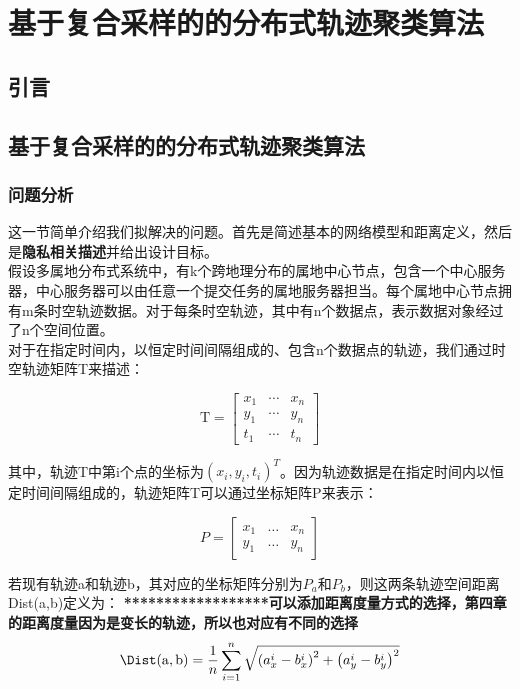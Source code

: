 \chapter{基于复合采样的的分布式轨迹聚类算法}
\section{引言}



\section{基于复合采样的的分布式轨迹聚类算法}

\subsection{问题分析}
这一节简单介绍我们拟解决的问题。首先是简述基本的网络模型和距离定义，然后是\textbf{隐私相关描述}并给出设计目标。\\
假设多属地分布式系统中，有k个跨地理分布的属地中心节点，包含一个中心服务器，中心服务器可以由任意一个提交任务的属地服务器担当。每个属地中心节点拥有m条时空轨迹数据。对于每条时空轨迹，其中有n个数据点，表示数据对象经过了n个空间位置。\\
对于在指定时间内，以恒定时间间隔组成的、包含n个数据点的轨迹，我们通过时空轨迹矩阵T来描述：

\[
\mathrm{T}=\left[\begin{array}{lll}
{x_{1}} & {\cdots} & {x_{n}} \\
{y_{1}} & {\cdots} & {y_{n}} \\
{t_{1}} & {\cdots} & {t_{n}}
\end{array}\right]
\]

其中，轨迹T中第i个点的坐标为$(x_i,y_i,t_i)^T$。因为轨迹数据是在指定时间内以恒定时间间隔组成的，轨迹矩阵T可以通过坐标矩阵P来表示：

\[
P=\left[\begin{array}{lll}
{x_{1}} & {\dots} & {x_{n}} \\
{y_{1}} & {\dots} & {y_{n}}
\end{array}\right]
\]

若现有轨迹a和轨迹b，其对应的坐标矩阵分别为$P_a$和$P_b$，则这两条轨迹空间距离Dist(a,b)定义为：
\textbf{******************可以添加距离度量方式的选择，第四章的距离度量因为是变长的轨迹，所以也对应有不同的选择}\\

\begin{equation}
\label{ch3dist}
\Dist(\mathrm{a}, \mathrm{b})=\frac{1}{n} \sum_{i=1}^{n} \sqrt{\left(a_{x}^{i}-b_{x}^{i}\right)^{2}+\left(a_{y}^{i}-b_{y}^{i}\right)^{2}}
\end{equation}

